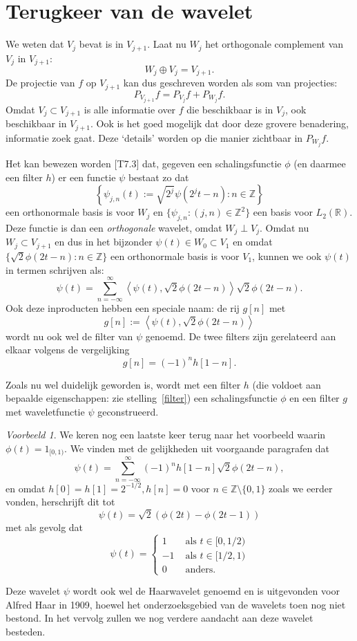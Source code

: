 \documentclass[11pt]{report}
\newcommand{\R}{\mathbb{R}}
\newcommand{\Z}{\mathbb{Z}}
\theoremstyle{plain}
\theoremstyle{remark}
\newtheorem*{voorbeeld}{Voorbeeld}
\begin{document}
\section{Terugkeer van de wavelet}
We weten dat $V_j$ bevat is in $V_{j+1}$. Laat nu $W_j$ het orthogonale complement van $V_j$ in $V_{j+1}$:
\[
	W_j \oplus V_j = V_{j+1}.
\]
De projectie van $f$ op $V_{j+1}$ kan dus geschreven worden als som van projecties:
\[
	P_{V_{j+1}} f = P_{V_j} f + P_{W_j} f.
\]
Omdat $V_j \subset V_{j+1}$ is alle informatie over $f$ die beschikbaar is in $V_j$, ook beschikbaar in $V_{j+1}$. Ook is het goed mogelijk dat door deze grovere benadering, informatie zoek gaat. Deze `details' worden op die manier zichtbaar in $P_{W_j} f$.

Het kan bewezen worden \cite{mallat}[T7.3] dat, gegeven een schalingsfunctie $\phi$ (en daarmee een filter $h$) er een functie $\psi$ bestaat zo dat 
\[
	\left\{ \psi_{j,n}(t) := \sqrt{2^j} \psi\left(2^jt - n\right) : n \in \Z \right\}
\] een orthonormale basis is voor $W_j$ en $\{ \psi_{j,n}: (j,n) \in \Z^2 \}$ een basis voor $L_2(\R)$. Deze functie is dan een \emph{orthogonale} wavelet, omdat $W_j \perp V_j$.
Omdat nu $W_j \subset V_{j+1}$ en dus in het bijzonder $\psi(t) \in W_0 \subset V_1$ en omdat $\{ \sqrt{2}\phi(2t-n): n \in \Z \}$ een orthonormale basis is voor $V_1$, kunnen we ook $\psi(t)$ in termen schrijven als:
\[
	\psi\left(t\right) = \sum_{n=-\infty}^{\infty} \left\langle \psi\left(t\right), \sqrt{2}\phi(2t-n) \right\rangle \sqrt{2}\phi(2t-n).
\]
Ook deze inproducten hebben een speciale naam: de rij $g[n]$ met
\[
	g[n] := \left\langle \psi\left(t\right), \sqrt{2}\phi(2t-n) \right\rangle 
\]
wordt nu ook wel de filter van $\psi$ genoemd. De twee filters zijn gerelateerd aan elkaar volgens de vergelijking\cite{wavelet_filter[V13]}\cite{daubechies[P958]}
\[
	g[n] = (-1)^{n}h[1-n].
\]

Zoals nu wel duidelijk geworden is, wordt met een filter $h$ (die voldoet aan bepaalde eigenschappen: zie stelling~\ref{filter}) een schalingsfunctie $\phi$ en een filter $g$ met waveletfunctie $\psi$ geconstrueerd.

\begin{voorbeeld}
We keren nog een laatste keer terug naar het voorbeeld waarin $\phi(t) = 1_{[0,1)}$. We vinden met de gelijkheden uit voorgaande paragrafen dat
\[
\psi\left(t\right) = \sum_{n=-\infty}^{\infty} (-1)^{n}h[1-n] \sqrt{2}\phi(2t-n),
\]
en omdat $h[0] = h[1] = 2^{-1/2}, h[n] = 0$ voor $n \in \Z \setminus \{0,1\}$ zoals we eerder vonden, herschrijft dit tot
\[
\psi\left(t\right) = \sqrt{2}\left(\phi(2t) - \phi(2t - 1)\right)
\]
met als gevolg dat
\[
	\psi(t) = \begin{cases} 1 & \text{ als } t \in [0,1/2) \\ -1 & \text{ als } t \in [1/2,1) \\ 0 & \text{ anders.} \end{cases}
\]

Deze wavelet $\psi$ wordt ook wel de Haarwavelet genoemd en is uitgevonden voor Alfred Haar in 1909, hoewel het onderzoeksgebied van de wavelets toen nog niet bestond. In het vervolg zullen we nog verdere aandacht aan deze wavelet besteden.
\end{voorbeeld}
\end{document}
